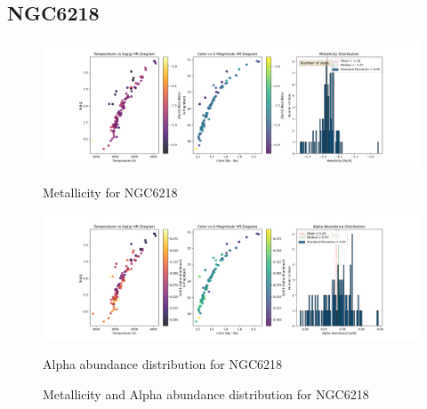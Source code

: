 \documentclass[a4paper,12pt]{article}
\begin{document}
\subsection{NGC6218}
\begin{figure}[H]
    \centering
    \begin{minipage}[b]{0.8\textwidth}
        \centering
        \includegraphics[width=\textwidth]{NGC6218_metalicity.png}
        \caption{Metallicity for NGC6218}
        \label{fig:NGC6218_metalicity}
    \end{minipage}
    \hfill
    \begin{minipage}[b]{0.8\textwidth}
        \centering
        \includegraphics[width=\textwidth]{NGC6218_alpha.png}
        \caption{Alpha abundance distribution for NGC6218}
        \label{fig:NGC6218_alpha}
    \end{minipage}
    \caption{Metallicity and Alpha abundance distribution for NGC6218}
    \label{fig:NGC6218_combined}
\end{figure}
\clearpage
\end{document}
